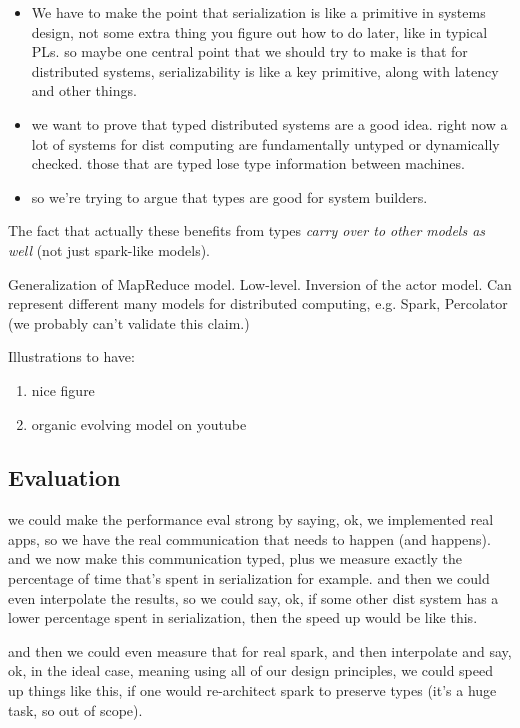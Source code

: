 \documentclass[preprint]{sigplanconf}
\theoremstyle{definition}
\theoremstyle{definition}
\begin{document}
\begin{itemize}

\item We have to make the point that serialization is like a primitive in
systems design, not some extra thing you figure out how to do later, like in
typical PLs. so maybe one central point that we should try to make is that
for distributed systems, serializability is like a key primitive, along with
latency and other things.

\item we want to prove that typed distributed systems are a good idea. right
now a lot of systems for dist computing are fundamentally untyped or
dynamically checked. those that are typed lose type information between
machines.

\item so we're trying to argue that types are good for system builders.

\end{itemize}

The fact that actually these benefits from types \emph{carry over to other
models as well} (not just spark-like models).


Generalization of MapReduce model. Low-level. Inversion of the actor model.
Can represent different many models for distributed computing, e.g. Spark,
Percolator (we probably can't validate this claim.)

Illustrations to have:
\begin{enumerate}
\item nice figure
\item organic evolving model on youtube
\end{enumerate}

\subsection{Evaluation}

we could make the performance eval strong by saying, ok, we implemented real
apps, so we have the real communication that needs to happen (and happens).
and we now make this communication typed, plus we measure exactly the
percentage of time that's spent in serialization for example. and then we
could even interpolate the results, so we could say, ok, if some other dist
system has a lower percentage spent in serialization, then the speed up would
be like this.

and then we could even measure that for real spark, and then interpolate and
say, ok, in the ideal case, meaning using all of our design principles, we
could speed up things like this, if one would re-architect spark to preserve
types (it's a huge task, so out of scope).
\end{document}
